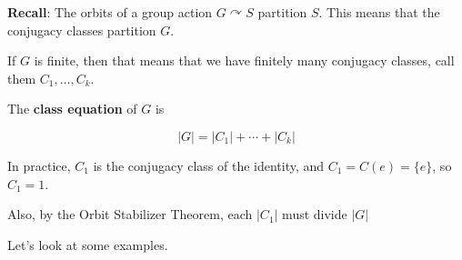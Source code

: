 \documentclass[12pt]{article}
\def\acts{\curvearrowright}
\begin{document}
{\bf Recall}: The orbits of a group action $G \acts S$ partition $S$. This means
that the conjugacy classes partition $G$.

If $G$ is finite, then that means that we have finitely many conjugacy classes,
call them $C_1, \dots, C_k$.

The {\bf class equation} of $G$ is

\[
  |G| = |C_1| + \cdots + |C_k|
\]

In practice, $C_1$ is the conjugacy class of the identity, and $C_1 = C(e) =
\{e\}$, so $C_1 = 1$.

Also, by the Orbit Stabilizer Theorem, each $|C_1|$ must divide $|G|$

Let's look at some examples.

\end{document}
